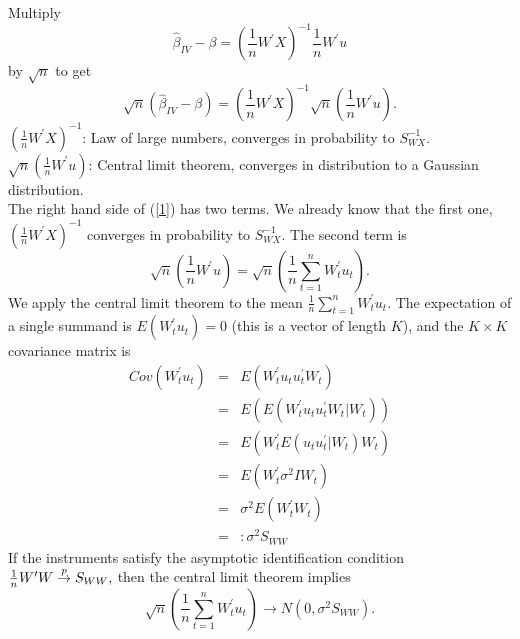 \documentclass{article}
\begin{document}
Multiply%
\begin{equation*}
\hat{\beta}_{IV}-\beta =\left( \frac{1}{n}W^{\prime }X\right) ^{-1}\frac{1}{n%
}W^{\prime }u
\end{equation*}%
by $\sqrt{n}$ to get%
\begin{equation}
\sqrt{n}\left( \hat{\beta}_{IV}-\beta \right) =\left( \frac{1}{n}W^{\prime
}X\right) ^{-1}\sqrt{n}\left( \frac{1}{n}W^{\prime }u\right) .  \label{1}
\end{equation}%
$\left( \frac{1}{n}W^{\prime}X\right) ^{-1}$: Law of large numbers, converges in probability to $S_{WX}^{-1}$.\\
$\sqrt{n}\left( \frac{1}{n}W^{\prime }u\right)$: Central limit theorem, converges in distribution to a Gaussian distribution.\\
The right hand side of (\ref{1}) has two terms. We already know that the
first one, $\left( \frac{1}{n}W^{\prime }X\right) ^{-1}$ converges in
probability to $S_{WX}^{-1}$. The second term is
\begin{equation*}
\sqrt{n}\left( \frac{1}{n}W^{\prime }u\right) =\sqrt{n}\left( \frac{1}{n}%
\sum_{t=1}^{n}W_{t}^{\prime }u_{t}\right) .
\end{equation*}%
We apply the central limit theorem to the mean $\frac{1}{n}%
\sum_{t=1}^{n}W_{t}^{\prime }u_{t}$. The expectation of a single summand is $%
E\left( W_{t}^{\prime }u_{t}\right) =0$ (this is a vector of length $K$),
and the $K\times K$ covariance matrix is
\begin{eqnarray*}
Cov\left( W_{t}^{\prime }u_{t}\right) &=&E\left( W_{t}^{\prime
}u_{t}u_{t}^{\prime }W_{t}\right) \\
&=&E\left( E\left( W_{t}^{\prime }u_{t}u_{t}^{\prime }W_{t}|W_{t}\right)
\right) \\
&=&E\left( W_{t}^{\prime }E\left( u_{t}u_{t}^{\prime }|W_{t}\right)
W_{t}\right) \\
&=&E\left( W_{t}^{\prime }\sigma ^{2}IW_{t}\right) \\
&=&\sigma ^{2}E\left( W_{t}^{\prime }W_{t}\right) \\
&=&:\sigma ^{2}S_{WW}
\end{eqnarray*}%
If the instruments satisfy the asymptotic identification condition $\frac{1}{%
n}W^{\prime }W\overset{p}{\rightarrow }S_{WW},$ then the central limit
theorem implies%
\begin{equation*}
\sqrt{n}\left( \frac{1}{n}\sum_{t=1}^{n}W_{t}^{\prime }u_{t}\right)
\rightarrow N\left( 0,\sigma ^{2}S_{WW}\right) .
\end{equation*}%
\end{document}
